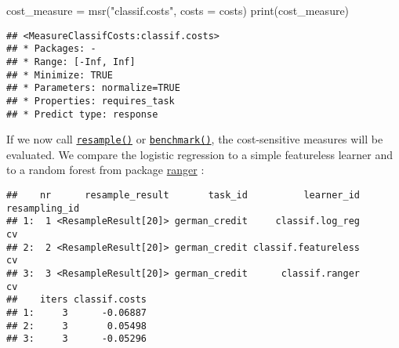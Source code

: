 \documentclass[
]{scrbook}
\newenvironment{Shaded}{\begin{snugshade}}{\end{snugshade}}
\newcommand{\AttributeTok}[1]{\textcolor[rgb]{0.77,0.63,0.00}{#1}}
\newcommand{\DecValTok}[1]{\textcolor[rgb]{0.00,0.00,0.81}{#1}}
\newcommand{\FunctionTok}[1]{\textcolor[rgb]{0.00,0.00,0.00}{#1}}
\newcommand{\NormalTok}[1]{#1}
\newcommand{\OtherTok}[1]{\textcolor[rgb]{0.56,0.35,0.01}{#1}}
\newcommand{\SpecialCharTok}[1]{\textcolor[rgb]{0.00,0.00,0.00}{#1}}
\newcommand{\StringTok}[1]{\textcolor[rgb]{0.31,0.60,0.02}{#1}}
\renewenvironment{Shaded} {\begin{snugshade}\small} {\end{snugshade}}
\begin{document}
\begin{Shaded}
\begin{Highlighting}[]
\NormalTok{cost\_measure }\OtherTok{=} \FunctionTok{msr}\NormalTok{(}\StringTok{"classif.costs"}\NormalTok{, }\AttributeTok{costs =}\NormalTok{ costs)}
\FunctionTok{print}\NormalTok{(cost\_measure)}
\end{Highlighting}
\end{Shaded}

\begin{verbatim}
## <MeasureClassifCosts:classif.costs>
## * Packages: -
## * Range: [-Inf, Inf]
## * Minimize: TRUE
## * Parameters: normalize=TRUE
## * Properties: requires_task
## * Predict type: response
\end{verbatim}

If we now call \href{https://mlr3.mlr-org.com/reference/resample.html}{\texttt{resample()}} or \href{https://mlr3.mlr-org.com/reference/benchmark.html}{\texttt{benchmark()}}, the cost-sensitive measures will be evaluated.
We compare the logistic regression to a simple featureless learner and to a random forest from package \href{https://cran.r-project.org/package=ranger}{ranger} :

\begin{Shaded}
\end{Shaded}

\begin{verbatim}
##    nr      resample_result       task_id          learner_id resampling_id
## 1:  1 <ResampleResult[20]> german_credit     classif.log_reg            cv
## 2:  2 <ResampleResult[20]> german_credit classif.featureless            cv
## 3:  3 <ResampleResult[20]> german_credit      classif.ranger            cv
##    iters classif.costs
## 1:     3      -0.06887
## 2:     3       0.05498
## 3:     3      -0.05296
\end{verbatim}
\end{document}
